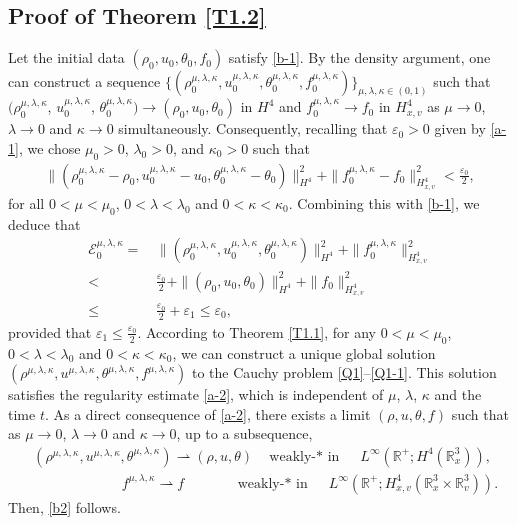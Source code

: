 \documentclass[reqno,11pt]{amsart}
\theoremstyle{plain}
\numberwithin{equation}{section}
\newcommand{\eps}{{\varepsilon}}
\begin{document}
\subsection{Proof of Theorem \ref{T1.2}}
Let the initial data $(\rho_0, u_0, \theta_0, f_0)$ satisfy 
\eqref{b-1}. By the density argument, one can construct a 
sequence $\{(\rho_0^{\mu,\lambda,\kappa}, u_0^{\mu,\lambda,\kappa}, 
\theta_0^{\mu,\lambda,\kappa}, f_0^{\mu,\lambda,\kappa})\}_{\mu,\lambda,\kappa \in (0,1)}$ 
such that $(\rho_0^{\mu,\lambda,\kappa}$, $ u_0^{\mu,\lambda,\kappa}$, 
$\theta_0^{\mu,\lambda,\kappa}) \to (\rho_0, u_0, \theta_0)$ in $H^4$ 
and $f_0^{\mu,\lambda,\kappa} \to f_0$ in $H_{x,v}^4$ as $\mu\rightarrow0$, 
$\lambda\rightarrow 0$ and $\kappa \to 0$ simultaneously. Consequently, 
recalling that $\eps_0 > 0$ given by \eqref{a-1}, 
we chose $\mu_0>0$, $\lambda_0>0$, and $\kappa_0 > 0$ such  that  
\begin{align*}  
\|(\rho_0^{\mu,\lambda,\kappa} - \rho_0, u_0^{\mu,\lambda,\kappa} - u_0, 
\theta_0^{\mu,\lambda,\kappa} - \theta_0)\|_{H^4}^2 + \|f_0^{\mu,\lambda,\kappa} 
- f_0\|_{H_{x,v}^4}^2 < \frac{\eps_0}{2},  
\end{align*}  
for all $0<\mu<\mu_0$, $0<\lambda<\lambda_0$ and $0 < \kappa < \kappa_0$. 
Combining this with \eqref{b-1}, we deduce that 
\begin{align*}  
\mathcal{E}_0^{\mu,\lambda,\kappa} =&\, \|(\rho_0^{\mu,\lambda,\kappa}, u_0^{\mu,\lambda,\kappa}, \theta_0^{\mu,\lambda,\kappa})\|_{H^4}^2
 + \|f_0^{\mu,\lambda,\kappa}\|_{H_{x,v}^4}^2  \nonumber\\
<&\, \frac{\eps_0}{2} + \|(\rho_0, u_0, \theta_0)\|_{H^4}^2 + \|f_0\|_{H_{x,v}^4}^2 \nonumber\\
\leq&\, \frac{\eps_0}{2} + \eps_1 \leq \eps_0,  
\end{align*}  
provided that $\eps_1 \leq \frac{\eps_0}{2}$. According
 to Theorem \ref{T1.1}, for any  $0<\mu<\mu_0$, $0<\lambda<\lambda_0$ and
  $0 < \kappa < \kappa_0$, we can construct a unique global solution 
  $(\rho^{\mu,\lambda,\kappa}, u^{\mu,\lambda,\kappa}, \theta^{\mu,\lambda,\kappa},
   f^{\mu,\lambda,\kappa})$ to the Cauchy problem \eqref{Q1}--\eqref{Q1-1}. 
   This solution satisfies the regularity estimate \eqref{a-2}, 
   which is independent of $\mu$, $\lambda$,  $\kappa$ and 
   the time $t$. As a direct consequence of \eqref{a-2}, there exists a limit $(\rho, u, \theta, f)$
such that as $\mu\rightarrow0$, $\lambda\rightarrow 0$ and $\kappa \to 0$, up to a subsequence,  
\begin{align*}  
&(\rho^{\mu,\lambda,\kappa}, u^{\mu,\lambda,\kappa}, \theta^{\mu,\lambda,\kappa} ) \rightharpoonup (\rho, u, \theta ) \quad \text{weakly-$*$ in } \quad L^\infty( \mathbb{R}^+; H^4(\mathbb{R}^3_x)),\\
&\quad\quad \quad \qquad\,\,\,\,\,\,\,\,f^{\mu,\lambda,\kappa} \rightharpoonup f \quad\quad\quad\,\,\,\,  \text{weakly-$*$ in } \quad L^\infty( \mathbb{R}^+; H_{x,v}^4(\mathbb{R}^3_x\times\mathbb{R}^3_v)).
\end{align*}  
Then, \eqref{b2} follows.
\end{document}
